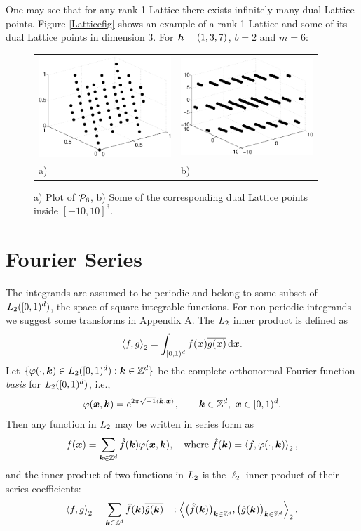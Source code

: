 \documentclass[graybox]{svmult}
\newcommand{\Z}{\mathbb{Z}} %
\newcommand{\bsx}{\boldsymbol{x}}    %
\begin{document}
One may see that for any rank-1 Lattice there exists infinitely many dual Lattice points. Figure \eqref{Latticefig} shows an example of a rank-1 Lattice and some of its dual Lattice points in dimension 3. For $\boldsymbol{h}=(1,3,7)$, $b=2$ and $m=6$:
\begin{figure}[h!]
\centering
\begin{tabular}{>{\centering}p{5cm}>{\centering}p{5cm}}
\includegraphics[width=5cm]{Images/Lattice64.eps} &
\includegraphics[width=5cm]{Images/DualLattice64.eps}\tabularnewline
a) & b)
\end{tabular}
\caption{a) Plot of $\mathcal{P}_6$, b) Some of the corresponding dual Lattice points inside $[-10,10]^3$.}\label{Latticefig}
\end{figure}

\section{Fourier Series}\label{secfourierseries}

The integrands are assumed to be periodic and belong to some subset of $L_2([0,1)^d)$, the space of square integrable functions. For non periodic integrands we suggest some transforms in Appendix A. The $L_2$ inner product is defined as
\[
\ip[2]{f}{g} = \int_{\cube} f(\bsx) \overline{g(\bsx)} \, \dif \bsx.
\]
Let $\{\varphi(\cdot,\bsk) \in \Lebesgue_2(\cube) : \bsk \in \Z^d\}$ be the complete orthonormal Fourier function \emph{basis} for $L_2([0,1)^d)$, i.e.,
\[
\varphi(\bsx,\bsk)  = \E^{2 \pi \sqrt{-1} \ip{\bsk}{\bsx}}, \qquad \bsk \in \Z^d, \ \bsx \in \cube.
\]
Then any function in $L_2$ may be written in series form as
\begin{equation} \label{Fourierdef}
f(\bsx) = \sum_{\bsk \in \Z^d} \hf(\bsk) \varphi(\bsx,\bsk), \quad \text{where } \hf(\bsk) = \ip[2]{f}{\varphi(\cdot,\bsk)},
\end{equation}
and the inner product of two functions in $L_2$ is the $\ell_2$ inner product of their series coefficients:
\[
\ip[2]{f}{g} = \sum_{\bsk \in \Z^d} \hf(\bsk)\overline{\hg(\bsk)} =: \ip[2]{\bigl(\hf(\bsk)\bigr)_{\bsk \in \Z^d}}{\bigl ( \hg(\bsk)\bigr )_{\bsk \in \Z^d}}.
\]
\end{document}
